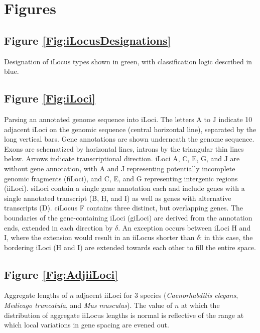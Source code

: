 \section{Figures} %

\subsection*{Figure \ref{Fig:iLocusDesignations}}

\noindent
Designation of iLocus types shown in green, with classification logic described in blue.

\subsection*{Figure \ref{Fig:iLoci}}

\noindent
Parsing an annotated genome sequence into iLoci.
The letters A to J indicate 10 adjacent iLoci on the genomic sequence (central horizontal line), separated by the long vertical bars.
Gene annotations are shown underneath the genome sequence.
Exons are schematized by horizontal lines, introns by the triangular thin lines below.
Arrows indicate transcriptional direction.
iLoci A, C, E, G, and J are without gene annotation, with A and J representing potentially incomplete genomic fragments (fiLoci), and C, E, and G representing intergenic regions (iiLoci).
siLoci contain a single gene annotation each and include genes with a single annotated transcript (B, H, and I) as well as genes with alternative transcripts (D).
ciLocus F contains three distinct, but overlapping genes.
The boundaries of the gene-containing iLoci (giLoci) are derived from the annotation ends, extended in each direction by $\delta$.
An exception occurs between iLoci H and I, where the extension would result in an iiLocus shorter than $\delta$: in this case, the bordering iLoci (H and I) are extended towards each other to fill the entire space.

\subsection*{Figure \ref{Fig:AdjiiLoci}}

\noindent
Aggregate lengths of $n$ adjacent iiLoci for 3 species (\textit{Caenorhabditis elegans}, \textit{Medicago truncatula}, and \textit{Mus musculus}). The value of $n$ at which the distribution of aggregate iiLocus lengths is normal is reflective of the range at which local variations in gene spacing are evened out.

